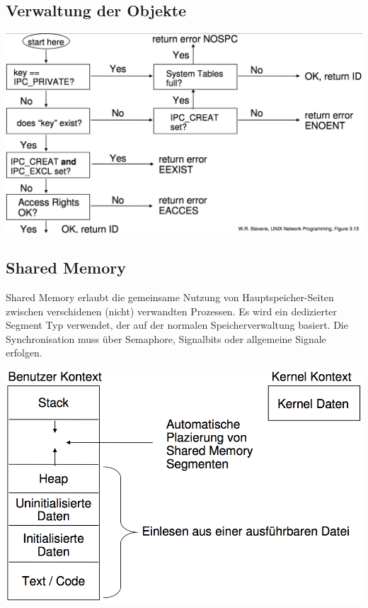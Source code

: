 \documentclass[10pt]{article}
\begin{document}
\subsection{Verwaltung der Objekte}
\begin{center}
	\includegraphics[scale=0.2]{ipc-verwaltung.png}
\end{center}

\newpage
\subsection{Shared Memory}
Shared Memory erlaubt die gemeinsame Nutzung von Hauptspeicher-Seiten zwischen verschidenen (nicht) verwandten Prozessen. Es wird ein dedizierter Segment Typ verwendet, der auf der normalen Speicherverwaltung basiert. Die Synchronisation muss über Semaphore, Signalbits oder allgemeine Signale erfolgen.
\begin{center}
	\includegraphics[scale=0.2]{sharedmemory-process-adress.png}
\end{center}
\end{document}
